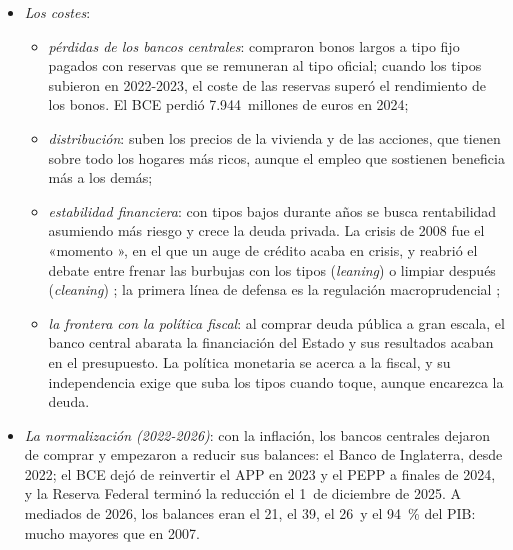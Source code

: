 \documentclass[11pt]{article}
\begin{document}
\begin{itemize}
\item \emph{Los costes}:
  \begin{itemize}
  \item \emph{pérdidas de los bancos centrales}: compraron bonos largos a tipo fijo pagados con reservas que se remuneran al tipo oficial; cuando los tipos subieron en 2022-2023, el coste de las reservas superó el rendimiento de los bonos. El BCE perdió 7.944~millones de euros en 2024\nocite{BCE2025Cuentas2024};
  \item \emph{distribución}: suben los precios de la vivienda y de las acciones, que tienen sobre todo los hogares más ricos, aunque el empleo que sostienen beneficia más a los demás;
  \item \emph{estabilidad financiera}: con tipos bajos durante años se busca rentabilidad asumiendo más riesgo y crece la deuda privada. La crisis de 2008 fue el «momento », en el que un auge de crédito acaba en crisis, y reabrió el debate entre frenar las burbujas con los tipos (\emph{leaning}) o limpiar después (\emph{cleaning}) ; la primera línea de defensa es la regulación macroprudencial ;
  \item \emph{la frontera con la política fiscal}: al comprar deuda pública a gran escala, el banco central abarata la financiación del Estado y sus resultados acaban en el presupuesto. La política monetaria se acerca a la fiscal, y su independencia exige que suba los tipos cuando toque, aunque encarezca la deuda.
  \end{itemize}
\item \emph{La normalización (2022-2026)}: con la inflación, los bancos centrales dejaron de comprar y empezaron a reducir sus balances: el Banco de Inglaterra, desde 2022; el BCE dejó de reinvertir el APP en 2023 y el PEPP a finales de 2024, y la Reserva Federal terminó la reducción el 1~de diciembre de 2025\nocite{BoE2026QE,BCE2026APP,BCE2026PEPP,Fed2025FOMCoct}. A mediados de 2026, los balances eran el 21, el 39, el 26~y el 94~\% del PIB\nocite{BPI2026CBTA}: mucho mayores que en 2007.
\end{itemize}
\end{document}
